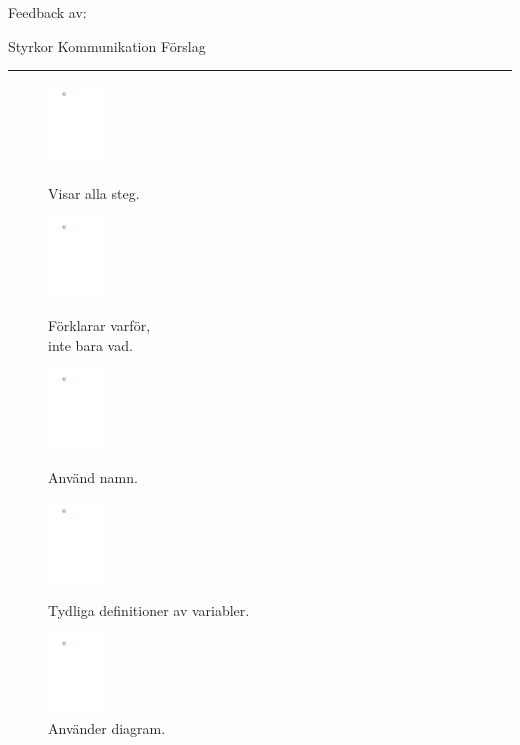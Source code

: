 \begin{questions}



\newpage
\begin{center}
  Feedback av:\enspace\makebox[2in]{\hrulefill}\\
\end{center}

\smallskip
\noindent Styrkor \hfill Kommunikation \hfill Förslag \hrule

\begin{figure}[H]
    \centering
    \includegraphics[width=1.5cm, page=3]{img/Bilder.pdf}
    \caption*{Visar alla steg.}
    \includegraphics[width=1.5cm, page=2]{img/Bilder.pdf}
    \caption*{Förklarar varför,\\ inte bara vad.}
    \includegraphics[width=1.5cm, page=1]{img/Bilder.pdf}
    \caption*{Använd namn.}
    \includegraphics[width=1.5cm, page=5]{img/Bilder.pdf}
    \caption*{Tydliga definitioner av variabler.}
    \includegraphics[width=1.5cm, page=6]{img/Bilder.pdf}
    \caption*{Använder diagram.}
\end{figure}


\end{questions}
